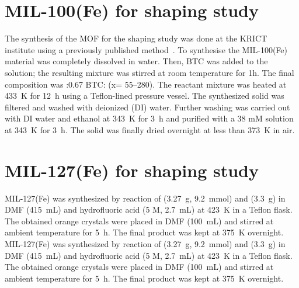 \section{MIL-100(Fe) for shaping study}%
\label{appx:synthesis:mil100shaping}

The synthesis of the \gls{MOF} for the shaping study was 
done at the KRICT institute using a previously
published method~\cite{jeremiasAmbientPressureSynthesis2016}.
To synthesise the MIL-100(Fe) material 
 was completely dissolved in water.
Then, \gls{BTC} was added to the
solution; the resulting mixture was stirred at room temperature 
for 1h. The final composition was :0.67 
\gls{BTC}: 
(x= 55–280). The reactant mixture was heated at \SI{433}{\kelvin} for
\SI{12}{\hour} using a Teflon-lined pressure vessel. The synthesized 
solid was filtered and washed with deionized (DI) water.
Further washing was carried out with DI water and ethanol at
\SI{343}{\kelvin} for \SI{3}{\hour} and purified with a 
38 mM  solution at \SI{343}{\kelvin} for \SI{3}{\hour}. 
The solid was finally dried overnight at less than 
\SI{373}{\kelvin} in air.

\section{MIL-127(Fe) for shaping study}%
\label{appx:synthesis:mil127shaping}

MIL-127(Fe) was synthesized by reaction of
 (\SI{3.27}{\gram}, \SI{9.2}{\milli\mol}) and 
 (\SI{3.3}{\gram}) in \gls{DMF} (\SI{415}{\milli\liter}) 
and hydrofluoric acid (5 M, \SI{2.7}{\milli\liter}) at 
\SI{423}{\kelvin} in a Teflon
flask. The obtained orange crystals were placed in 
\gls{DMF} (\SI{100}{\milli\liter}) and stirred at ambient temperature for 
\SI{5}{\hour}. The final product was kept at 
\SI{375}{\kelvin} overnight. MIL-127(Fe) was synthesized by reaction of
 (\SI{3.27}{\gram}, \SI{9.2}{\milli\mol}) and 
 (\SI{3.3}{\gram}) in \gls{DMF}
(\SI{415}{\milli\liter}) and hydrofluoric acid (5 M, 
\SI{2.7}{\milli\liter}) at \SI{423}{\kelvin} in a Teflon 
flask. The obtained orange crystals were placed in \gls{DMF} 
(\SI{100}{\milli\liter}) and stirred at ambient temperature 
for \SI{5}{\hour}. The final product was
kept at \SI{375}{\kelvin} overnight.


